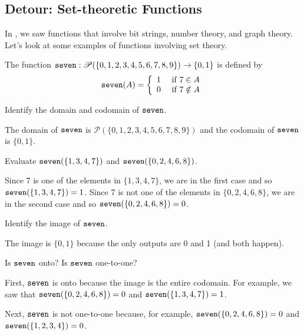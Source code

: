 
\newcommand{\subsetfn}{Detour: Set-theoretic Functions}
\subsection{\subsetfn}
\label{sub_set_functions}

In , we saw functions that involve bit strings, number theory, and graph theory.  Let's look at some examples of functions involving set theory.

\begin{exam}[Is 7 in set?]
\label{exam_is7_function} 
    The function $\texttt{seven}:\mathscr{P}(\{0,1,2,3,4,5,6,7,8,9\}) \to \{0,1\}$ is defined by 
        $$\texttt{seven}(A) = \left\{
        \begin{array}{cl}
        1 & \text{ if }7 \in A \\
        0 & \text{ if }7 \notin A \\
        \end{array}
        \right.$$
        \begin{apart}
            \item Identify the domain and codomain of $\texttt{seven}$.
                \begin{soln}
                    The domain of $\texttt{seven}$ is $\mathscr{P}(\{0,1,2,3,4,5,6,7,8,9\})$ and the codomain of $\texttt{seven}$ is $\{0,1\}$.
                \end{soln}
            \item Evaluate $\texttt{seven}(\{1,3,4,7\})$ and $\texttt{seven}(\{0,2,4,6,8\})$. 
                \begin{soln}
                    Since 7 is one of the elements in $\{1,3,4,7\}$, we are in the first case and so $\texttt{seven}(\{1,3,4,7\})=1$. 
                    Since 7 is not one of the elements in $\{0,2,4,6,8\}$, we are in the second case and so $\texttt{seven}(\{0,2,4,6,8\})=0$.
                \end{soln}
            \item Identify the image of $\texttt{seven}$.
                \begin{soln}
                    The image is $\{0,1\}$ because the only outputs are 0 and 1 (and both happen).
                \end{soln}
            \item Is $\texttt{seven}$ onto?  Is $\texttt{seven}$ one-to-one?
                \begin{soln}
                    First, $\texttt{seven}$ is onto because the image is the entire codomain.  For example, we saw that $\texttt{seven}(\{0,2,4,6,8\})=0$ and $\texttt{seven}(\{1,3,4,7\})=1$. 

                    Next, $\texttt{seven}$ is not one-to-one because, for example, $\texttt{seven}(\{0,2,4,6,8\})=0$ and $\texttt{seven}(\{1,2,3,4\})=0$.
                \end{soln}
        \end{apart}
\end{exam}

